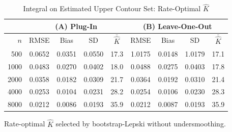 \documentclass[12pt,american]{article}
\theoremstyle{definition}
\theoremstyle{plain}
\theoremstyle{definition}
\theoremstyle{plain}
\theoremstyle{plain}
\theoremstyle{plain}
\theoremstyle{plain}
\theoremstyle{plain}
\begin{document}
\begin{table}[h]
  \centering
  \caption{Integral on Estimated Upper Contour Set: Rate-Optimal $\hat{K}$}
  \label{tab:Sim2_Disk_RateOpt}
  \begin{threeparttable}
    \begin{tabular}{r|cccc|cccc}
      \toprule
      & \multicolumn{4}{c|}{(A) Plug-In} & \multicolumn{4}{c}{(B) Leave-One-Out} \\
      \midrule
      $n$ & RMSE & Bias & SD & $\bar{\hat{K}}$ & RMSE & Bias & SD & $\bar{\hat{K}}$ \\
      \midrule
      500  & 0.0652 & 0.0351 & 0.0550 & 17.3 & 1.0175 & 0.0148 & 1.0179 & 17.1 \\
      1000 & 0.0483 & 0.0270 & 0.0402 & 18.0 & 0.0488 & 0.0275 & 0.0403 & 17.8 \\
      2000 & 0.0358 & 0.0182 & 0.0309 & 21.7 & 0.0364 & 0.0192 & 0.0310 & 21.4 \\
      4000 & 0.0253 & 0.0104 & 0.0231 & 28.2 & 0.0254 & 0.0106 & 0.0230 & 28.3 \\
      8000 & 0.0212 & 0.0086 & 0.0193 & 35.9 & 0.0212 & 0.0087 & 0.0193 & 35.9 \\
      \bottomrule
    \end{tabular}
    \begin{tablenotes}
      \footnotesize
    \item Rate-optimal $\hat{K}$ selected by bootstrap-Lepski without undersmoothing.
    \end{tablenotes}
  \end{threeparttable}
\end{table}
\end{document}
